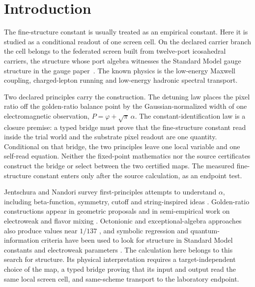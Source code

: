 \documentclass[11pt]{article}
\theoremstyle{remark}
\begin{document}
\section{Introduction}

The fine-structure constant is usually treated as an empirical constant.
Here it is studied as a conditional readout of one screen cell. On the
declared carrier branch the cell belongs to the federated screen built from
twelve-port icosahedral carriers, the structure whose port algebra
witnesses the Standard Model gauge structure in the gauge
paper~\cite{oph-smgr}. The known physics is the low-energy Maxwell coupling,
charged-lepton running and low-energy hadronic spectral transport.

Two declared principles carry the construction. The detuning law places the
pixel ratio off the golden-ratio balance point by the Gaussian-normalized
width of one electromagnetic observation, \(P=\varphi+\sqrt\pi\,\alpha\).
The constant-identification law is a closure premise: a typed bridge must
prove that the fine-structure constant read inside the trial world and the
substrate pixel readout are one quantity. Conditional on that bridge, the
two principles leave one local variable and one self-read equation. Neither
the fixed-point mathematics nor the source certificates construct the bridge
or select between the two certified maps. The measured fine-structure
constant enters only after the source calculation, as an endpoint test.

Jentschura and Nandori survey first-principles attempts to understand
\(\alpha\), including beta-function, symmetry, cutoff and string-inspired
ideas \cite{jentschura-nandori}. Golden-ratio constructions appear in
geometric proposals \cite{heyrovska-narayan} and in semi-empirical work on
electroweak and flavor mixing \cite{ciborowski}. Octonionic and
exceptional-algebra approaches also produce values near \(1/137\)
\cite{singh}, and symbolic regression and quantum-information criteria have
been used to look for structure in Standard Model constants and electroweak
parameters \cite{chekanov-kjellerstrand,liu-low-yin}. The calculation here
belongs to this search for structure. Its physical interpretation requires a
target-independent choice of the map, a typed bridge proving that its input
and output read the same local screen cell, and same-scheme transport to the
laboratory endpoint.
\end{document}
